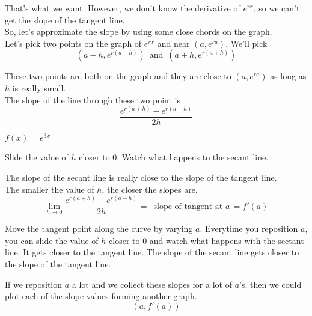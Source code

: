 \documentclass{ximera}
\begin{document}
That's what we want.  However, we don't know the derivative of $e^{r x}$, so we can't get the slope of the tangent line. \\

So, let's approximate the slope by using some close chords on the graph. \\



Let's pick two points on the graph of $e^{r x}$ and near $(a, e^{r a})$.  We'll pick
\[
(a-h, e^{r(a-h)}) \, \text{ and } \, (a+h, e^{r(a+h)})
\]

These two points are both on the graph and they are close to $(a, e^{r a})$ as long as $h$ is really small. \\

The slope of the line through these two point is 
\[
\frac{e^{r(a+h)} - e^{r(a-h)}}{2h}
\]




\begin{example}  $f(x) = e^{3 x}$

\begin{center}
\end{center}



Slide the value of $h$ closer to $0$.  Watch what happens to the secant line.

\end{example}





The slope of the secant line is really close to the slope of the tangent line. \\

The smaller the value of $h$, the closer the slopes are. \\


\[
\lim_{h \to 0} \frac{e^{r(a+h)} - e^{r(a-h)}}{2h} = \, \text{ slope of tangent at }a \, = f'(a)
\]


Move the tangent point along the curve by varying $a$.  Everytime you reposition $a$, you can slide the value of $h$ closer to $0$ and watch what happens with the sectant line.  It gets closer to the tangent line.  The slope of the secant line gets closer to the slope of the tangent line.

If we reposition $a$ a lot and we collect these slopes for a lot of $a$'s, then we could plot each of the slope values forming another graph.
\[   (a, f'(a)) \]
\end{document}
